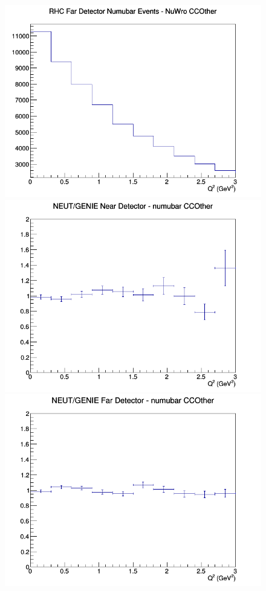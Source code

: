 \documentclass[12pt]{article}
\begin{document}
\begin{figure}[h]
\endminipage
{}
\includegraphics[width=\linewidth]{eff_Q2/FGT/CCOther_RHC_FD_numubar_Q2_NuWro.png}
\endminipage
\newline
{}
\includegraphics[width=\linewidth]{eff_Q2/FGT/ratios/CCOther_NEUT_GENIE_numubar_near_Q2.png}
\endminipage
{}
\includegraphics[width=\linewidth]{eff_Q2/FGT/ratios/CCOther_NEUT_GENIE_numubar_far_Q2.png}

\end{figure}
\end{document}
